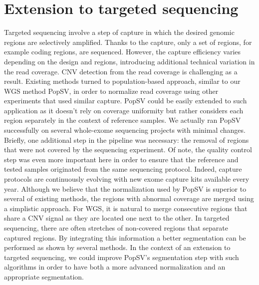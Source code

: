 \section*{Extension to targeted sequencing}
Targeted sequencing involve a step of capture in which the desired genomic regions are selectively amplified.
Thanks to the capture, only a set of regions, for example coding regions, are sequenced.
However, the capture efficiency varies depending on the design and regions, introducing additional technical variation in the read coverage.
CNV detection from the read coverage is challenging as a result.
Existing methods turned to population-based approach, similar to our WGS method {\sf PopSV}, in order to normalize read coverage using other experiments that used similar capture\cite{Shi2013,Talevich2014}.
{\sf PopSV} could be easily extended to such application as it doesn't rely on coverage uniformity but rather considers each region separately in the context of reference samples.
We actually ran {\sf PopSV} successfully on several whole-exome sequencing projects with minimal changes.
Briefly, one additional step in the pipeline was necessary: the removal of regions that were not covered by the sequencing experiment.
Of note, the quality control step was even more important here in order to ensure that the reference and tested samples originated from the same sequencing protocol.
Indeed, capture protocols are continuously evolving with new exome capture kits available every year.
Although we believe that the normalization used by {\sf PopSV} is superior to several of existing methods, the regions with abnormal coverage are merged using a simplistic approach.
For WGS, it is natural to merge consecutive regions that share a CNV signal as they are located one next to the other.
In targeted sequencing, there are often stretches of non-covered regions that separate captured regions.
By integrating this information a better segmentation can be performed as shown by several methods\cite{Fromer2012,Magi2013}.
In the context of an extension to targeted sequencing, we could improve {\sf PopSV}'s segmentation step with such algorithms in order to have both a more advanced normalization and an appropriate segmentation.

